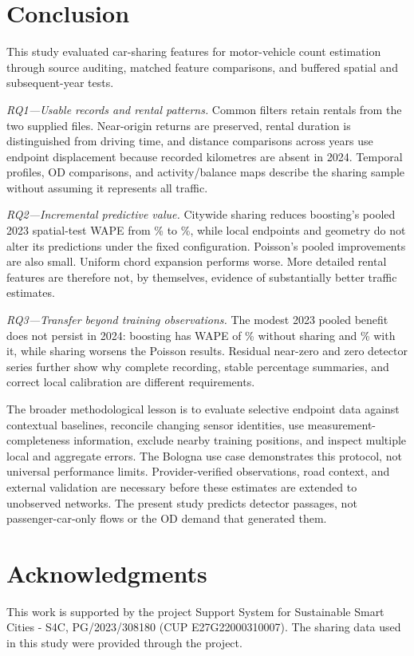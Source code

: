 \documentclass{interact}
\begin{document}
\section{Conclusion}
\label{sec:conclusion}
This study evaluated car-sharing features for motor-vehicle count estimation through source auditing, matched feature comparisons, and buffered spatial and subsequent-year tests.

\emph{RQ1---Usable records and rental patterns.} Common filters retain \RetainedCars{} rentals from the two supplied files. Near-origin returns are preserved, rental duration is distinguished from driving time, and distance comparisons across years use endpoint displacement because recorded kilometres are absent in 2024. Temporal profiles, OD comparisons, and activity/balance maps describe the sharing sample without assuming it represents all traffic.

\emph{RQ2---Incremental predictive value.} Citywide sharing reduces boosting's pooled 2023 spatial-test WAPE from \SpatialBoostBasePooled\%{} to \SpatialBoostGlobalPooled\%{}, while local endpoints and geometry do not alter its predictions under the fixed configuration. Poisson's pooled improvements are also small. Uniform chord expansion performs worse. More detailed rental features are therefore not, by themselves, evidence of substantially better traffic estimates.

\emph{RQ3---Transfer beyond training observations.} The modest 2023 pooled benefit does not persist in 2024: boosting has WAPE of \ForwardBoostBasePooled\%{} without sharing and \ForwardBoostGlobalPooled\%{} with it, while sharing worsens the Poisson results. Residual near-zero and zero detector series further show why complete recording, stable percentage summaries, and correct local calibration are different requirements.

The broader methodological lesson is to evaluate selective endpoint data against contextual baselines, reconcile changing sensor identities, use measurement-completeness information, exclude nearby training positions, and inspect multiple local and aggregate errors. The Bologna use case demonstrates this protocol, not universal performance limits. Provider-verified observations, road context, and external validation are necessary before these estimates are extended to unobserved networks. The present study predicts detector passages, not passenger-car-only flows or the OD demand that generated them.

\section*{Acknowledgments}
This work is supported by the project Support System for Sustainable Smart Cities - S4C, PG/2023/308180 (CUP E27G22000310007). The sharing data used in this study were provided through the project.
\end{document}
